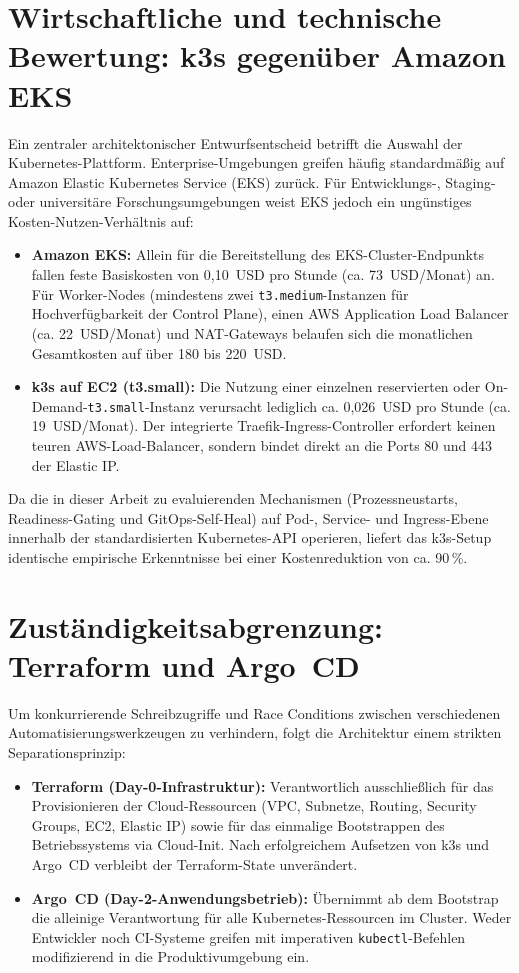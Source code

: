 \section{Wirtschaftliche und technische Bewertung: k3s gegenüber Amazon EKS}
\label{sec:wahl-k3s-vs-eks}
Ein zentraler architektonischer Entwurfsentscheid betrifft die Auswahl der Kubernetes-Plattform. Enterprise-Umgebungen greifen häufig standardmäßig auf Amazon Elastic Kubernetes Service (EKS) zurück. Für Entwicklungs-, Staging- oder universitäre Forschungsumgebungen weist EKS jedoch ein ungünstiges Kosten-Nutzen-Verhältnis auf:
\begin{itemize}[noitemsep,topsep=2pt]
    \item \textbf{Amazon EKS:} Allein für die Bereitstellung des EKS-Cluster-Endpunkts fallen feste Basiskosten von 0{,}10~USD pro Stunde (ca. 73~USD/Monat) an. Für Worker-Nodes (mindestens zwei \texttt{t3.medium}-Instanzen für Hochverfügbarkeit der Control Plane), einen AWS Application Load Balancer (ca. 22~USD/Monat) und NAT-Gateways belaufen sich die monatlichen Gesamtkosten auf über 180 bis 220~USD.
    \item \textbf{k3s auf EC2 (\textnormal{t3.small}):} Die Nutzung einer einzelnen reservierten oder On-Demand-\texttt{t3.small}-Instanz verursacht lediglich ca. 0{,}026~USD pro Stunde (ca. 19~USD/Monat). Der integrierte Traefik-Ingress-Controller erfordert keinen teuren AWS-Load-Balancer, sondern bindet direkt an die Ports 80 und 443 der Elastic IP.
\end{itemize}

Da die in dieser Arbeit zu evaluierenden Mechanismen (Prozessneustarts, Readiness-Gating und GitOps-Self-Heal) auf Pod-, Service- und Ingress-Ebene innerhalb der standardisierten Kubernetes-API operieren, liefert das k3s-Setup identische empirische Erkenntnisse bei einer Kostenreduktion von ca. 90\,\%.

\section{Zuständigkeitsabgrenzung: Terraform und Argo~CD}
\label{sec:zustaendigkeit-terraform-argocd}
Um konkurrierende Schreibzugriffe und Race Conditions zwischen verschiedenen Automatisierungswerkzeugen zu verhindern, folgt die Architektur einem strikten Separationsprinzip:
\begin{itemize}[noitemsep,topsep=2pt]
    \item \textbf{Terraform (Day-0-Infrastruktur):} Verantwortlich ausschließlich für das Provisionieren der Cloud-Ressourcen (VPC, Subnetze, Routing, Security Groups, EC2, Elastic IP) sowie für das einmalige Bootstrappen des Betriebssystems via Cloud-Init. Nach erfolgreichem Aufsetzen von k3s und Argo~CD verbleibt der Terraform-State unverändert.
    \item \textbf{Argo~CD (Day-2-Anwendungsbetrieb):} Übernimmt ab dem Bootstrap die alleinige Verantwortung für alle Kubernetes-Ressourcen im Cluster. Weder Entwickler noch CI-Systeme greifen mit imperativen \texttt{kubectl}-Befehlen modifizierend in die Produktivumgebung ein.
\end{itemize}

